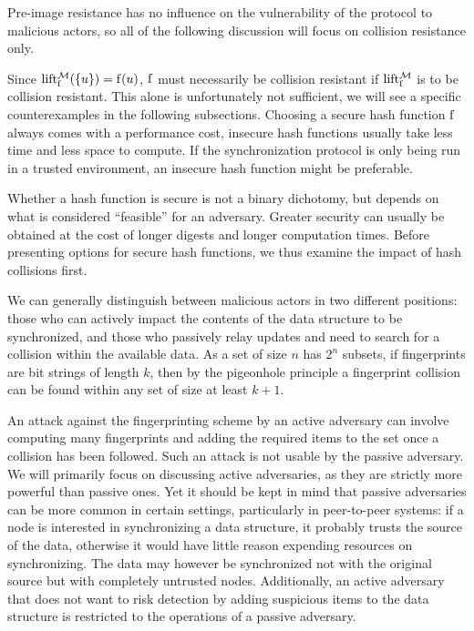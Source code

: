 Pre-image resistance has no influence on the vulnerability of the protocol to malicious actors, so all of the following discussion will focus on collision resistance only.

Since $\operatorname{lift_{\operatorname{f}}^{\mathcal{M}}}(\{u\}) = \operatorname{f}(u)$, $\operatorname{f}$ must necessarily be collision resistant if $\operatorname{lift_{\operatorname{f}}^{\mathcal{M}}}$ is to be collision resistant. This alone is unfortunately not sufficient, we will see a specific counterexamples in the following subsections. Choosing a secure hash function $\operatorname{f}$ always comes with a performance cost, insecure hash functions usually take less time and less space to compute. If the synchronization protocol is only being run in a trusted environment, an insecure hash function might be preferable.

Whether a hash function is secure is not a binary dichotomy, but depends on what is considered ``feasible'' for an adversary. Greater security can usually be obtained at the cost of longer digests and longer computation times. Before presenting options for secure hash functions, we thus examine the impact of hash collisions first.

We can generally distinguish between malicious actors in two different positions: those who can actively impact the contents of the data structure to be synchronized, and those who passively relay updates and need to search for a collision within the available data. As a set of size $n$ has $2^n$ subsets, if fingerprints are bit strings of length $k$, then by the pigeonhole principle a fingerprint collision can be found within any set of size at least $k + 1$.

An attack against the fingerprinting scheme by an active adversary can involve computing many fingerprints and adding the required items to the set once a collision has been followed. Such an attack is not usable by the passive adversary. We will primarily focus on discussing active adversaries, as they are strictly more powerful than passive ones. Yet it should be kept in mind that passive adversaries can be more common in certain settings, particularly in peer-to-peer systems: if a node is interested in synchronizing a data structure, it probably trusts the source of the data, otherwise it would have little reason expending resources on synchronizing. The data may however be synchronized not with the original source but with completely untrusted nodes. Additionally, an active adversary that does not want to risk detection by adding suspicious items to the data structure is restricted to the operations of a passive adversary.

